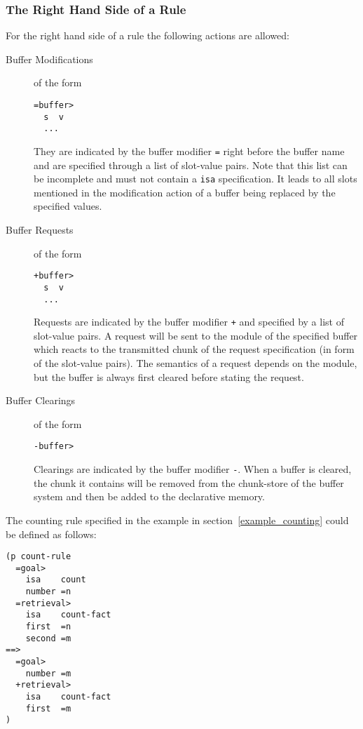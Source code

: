 \subsubsection{The Right Hand Side of a Rule}

For the right hand side of a rule the following actions are allowed:

\begin{description}
 \item[Buffer Modifications] of the form
\begin{lstlisting}
=buffer>
  s  v
  ...
\end{lstlisting}

They are indicated by the buffer modifier \lstinline|=| right before the buffer name and are specified through a list of slot-value pairs. Note that this list can be incomplete and must not contain a \lstinline|isa| specification. It leads to all slots mentioned in the modification action of a buffer being replaced by the specified values.

 \item[Buffer Requests] of the form
\begin{lstlisting}
+buffer>
  s  v
  ...
\end{lstlisting}

Requests are indicated by the buffer modifier \lstinline|+| and specified by a list of slot-value pairs. A request will be sent to the module of the specified buffer which reacts to the transmitted chunk of the request specification (in form of the slot-value pairs). The semantics of a request depends on the module, but the buffer is always first cleared before stating the request.
 \item[Buffer Clearings] of the form
 
\begin{lstlisting}
-buffer>
\end{lstlisting}

Clearings are indicated by the buffer modifier \lstinline|-|. When a buffer is cleared, the chunk it contains will be removed from the chunk-store of the buffer system and then be added to the declarative memory. 
\end{description}

\enlargethispage{-2\baselineskip}

\begin{example}
\label{ex:counting}
The counting rule specified in the example in section~\ref{example_counting} could be defined as follows:

\begin{lstlisting}
(p count-rule
  =goal> 
    isa    count
    number =n
  =retrieval>
    isa    count-fact
    first  =n
    second =m
==>
  =goal>
    number =m
  +retrieval>
    isa    count-fact
    first  =m
)
\end{lstlisting}
\end{example}

